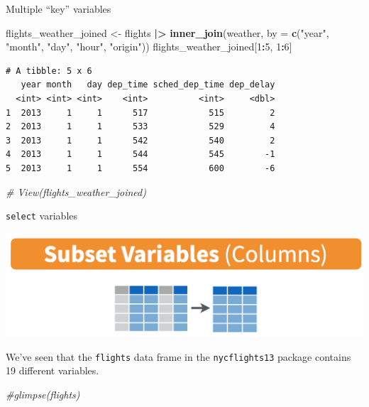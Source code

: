 \documentclass[
  ignorenonframetext,
]{beamer}
\newenvironment{Shaded}{\begin{snugshade}}{\end{snugshade}}
\newcommand{\AttributeTok}[1]{\textcolor[rgb]{0.13,0.29,0.53}{#1}}
\newcommand{\CommentTok}[1]{\textcolor[rgb]{0.56,0.35,0.01}{\textit{#1}}}
\newcommand{\DecValTok}[1]{\textcolor[rgb]{0.00,0.00,0.81}{#1}}
\newcommand{\FunctionTok}[1]{\textcolor[rgb]{0.13,0.29,0.53}{\textbf{#1}}}
\newcommand{\NormalTok}[1]{#1}
\newcommand{\OtherTok}[1]{\textcolor[rgb]{0.56,0.35,0.01}{#1}}
\newcommand{\SpecialCharTok}[1]{\textcolor[rgb]{0.81,0.36,0.00}{\textbf{#1}}}
\newcommand{\StringTok}[1]{\textcolor[rgb]{0.31,0.60,0.02}{#1}}
\begin{document}
\begin{frame}[fragile]{Multiple ``key'' variables}
\protect\hypertarget{multiple-key-variables-1}{}
\normalsize

\begin{Shaded}
\begin{Highlighting}[]
\NormalTok{flights\_weather\_joined }\OtherTok{\textless{}{-}}\NormalTok{ flights }\SpecialCharTok{|\textgreater{}}
  \FunctionTok{inner\_join}\NormalTok{(weather, }\AttributeTok{by =} \FunctionTok{c}\NormalTok{(}\StringTok{"year"}\NormalTok{, }\StringTok{"month"}\NormalTok{, }\StringTok{"day"}\NormalTok{, }
                             \StringTok{"hour"}\NormalTok{, }\StringTok{"origin"}\NormalTok{))}
\NormalTok{flights\_weather\_joined[}\DecValTok{1}\SpecialCharTok{:}\DecValTok{5}\NormalTok{, }\DecValTok{1}\SpecialCharTok{:}\DecValTok{6}\NormalTok{]}
\end{Highlighting}
\end{Shaded}

\begin{verbatim}
# A tibble: 5 x 6
   year month   day dep_time sched_dep_time dep_delay
  <int> <int> <int>    <int>          <int>     <dbl>
1  2013     1     1      517            515         2
2  2013     1     1      533            529         4
3  2013     1     1      542            540         2
4  2013     1     1      544            545        -1
5  2013     1     1      554            600        -6
\end{verbatim}

\begin{Shaded}
\begin{Highlighting}[]
\CommentTok{\# View(flights\_weather\_joined)}
\end{Highlighting}
\end{Shaded}

\normalsize
\end{frame}

\begin{frame}[fragile]{\texttt{select} variables}
\protect\hypertarget{select-variables}{}
\begin{center}\includegraphics[width=0.6\linewidth,height=0.45\textheight]{week3_8} \end{center}

We've seen that the \texttt{flights} data frame in the
\texttt{nycflights13} package contains 19 different variables.

\normalsize

\begin{Shaded}
\begin{Highlighting}[]
\CommentTok{\#glimpse(flights)}
\end{Highlighting}
\end{Shaded}

\normalsize
\end{frame}
\end{document}
